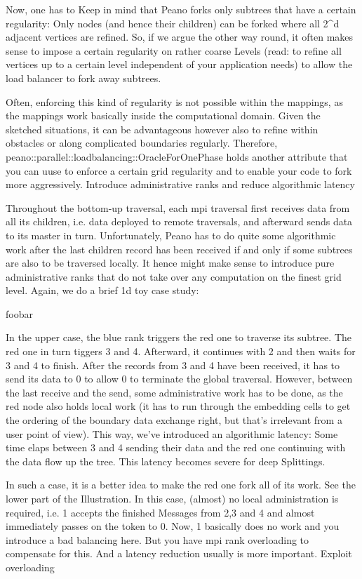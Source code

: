 Now, one has to Keep in mind that Peano forks only subtrees that have a certain regularity: Only nodes (and hence their children) can be forked where all 2^d adjacent vertices are refined. So, if we argue the other way round, it often makes sense to impose a certain regularity on rather coarse Levels (read: to refine all vertices up to a certain level independent of your application needs) to allow the load balancer to fork away subtrees.

Often, enforcing this kind of regularity is not possible within the mappings, as the mappings work basically inside the computational domain. Given the sketched situations, it can be advantageous however also to refine within obstacles or along complicated boundaries regularly. Therefore, peano::parallel::loadbalancing::OracleForOnePhase holds another attribute that you can uuse to enforce a certain grid regularity and to enable your code to fork more aggressively.
Introduce administrative ranks and reduce algorithmic latency

Throughout the bottom-up traversal, each mpi traversal first receives data from all its children, i.e. data deployed to remote traversals, and afterward sends data to its master in turn. Unfortunately, Peano has to do quite some algorithmic work after the last children record has been received if and only if some subtrees are also to be traversed locally. It hence might make sense to introduce pure administrative ranks that do not take over any computation on the finest grid level. Again, we do a brief 1d toy case study:

foobar

In the upper case, the blue rank triggers the red one to traverse its subtree. The red one in turn tiggers 3 and 4. Afterward, it continues with 2 and then waits for 3 and 4 to finish. After the records from 3 and 4 have been received, it has to send its data to 0 to allow 0 to terminate the global traversal. However, between the last receive and the send, some administrative work has to be done, as the red node also holds local work (it has to run through the embedding cells to get the ordering of the boundary data exchange right, but that's irrelevant from a user point of view). This way, we've introduced an algorithmic latency: Some time elaps between 3 and 4 sending their data and the red one continuing with the data flow up the tree. This latency becomes severe for deep Splittings.

In such a case, it is a better idea to make the red one fork all of its work. See the lower part of the Illustration. In this case, (almost) no local administration is required, i.e. 1 accepts the finished Messages from 2,3 and 4 and almost immediately passes on the token to 0. Now, 1 basically does no work and you introduce a bad balancing here. But you have mpi rank overloading to compensate for this. And a latency reduction usually is more important.
Exploit overloading

